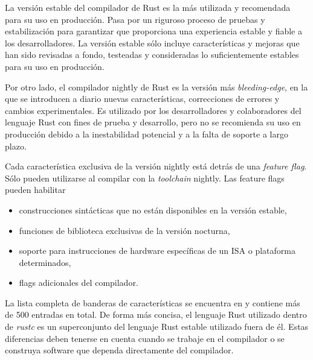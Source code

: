 La versión estable del compilador de Rust es la más utilizada y recomendada para su uso en
producción. Pasa por un riguroso proceso de pruebas y estabilización para garantizar que
proporciona una experiencia estable y fiable a los desarrolladores. La versión estable sólo
incluye características y mejoras que han sido revisadas a fondo, testeadas y consideradas lo
suficientemente estables para su uso en producción.

Por otro lado, el compilador nightly de Rust es la versión más \emph{bleeding-edge},
en la que se introducen a diario nuevas características,
correcciones de errores y cambios experimentales.
Es utilizado por los desarrolladores y colaboradores del lenguaje Rust con fines de prueba y desarrollo, pero
no se recomienda su uso en producción debido a la inestabilidad potencial y a la falta de
soporte a largo plazo.

Cada característica exclusiva de la versión nightly está detrás de una \emph{feature flag}.
Sólo pueden utilizarse al compilar con la \emph{toolchain} nightly. Las
feature flags pueden habilitar


\begin{itemize}
      \item construcciones sintácticas que no están disponibles en la versión estable,
      \item funciones de biblioteca exclusivas de la versión nocturna,
      \item soporte para instrucciones de hardware específicas de un \acrshort{ISA} o plataforma determinados,
      \item flags adicionales del compilador.
\end{itemize}

La lista completa de banderas de características se encuentra en \cite{unstable-book} y
contiene más de 500 entradas en total. De forma más concisa, el lenguaje Rust utilizado dentro
de \emph{rustc} es un superconjunto del lenguaje Rust estable utilizado fuera de él.
Estas diferencias deben tenerse en cuenta cuando se trabaje en el compilador
o se construya software que dependa directamente del compilador.